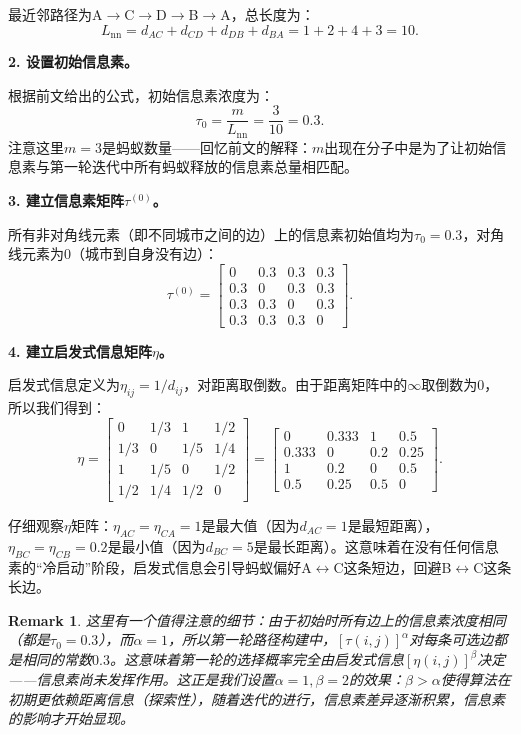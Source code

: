 \documentclass[lang=cn,zihao=-4,a4paper,fontset=windows]{beautybook}
\newtheorem*{remark}{\textbf{Remark}}
\begin{document}
最近邻路径为A$\to$C$\to$D$\to$B$\to$A，总长度为：
\[
L_{\text{nn}} = d_{AC} + d_{CD} + d_{DB} + d_{BA} = 1 + 2 + 4 + 3 = 10.
\]

\textbf{2. 设置初始信息素。}

根据前文给出的公式，初始信息素浓度为：
\[
\tau_0 = \frac{m}{L_{\text{nn}}} = \frac{3}{10} = 0.3.
\]
注意这里$m=3$是蚂蚁数量——回忆前文的解释：$m$出现在分子中是为了让初始信息素与第一轮迭代中所有蚂蚁释放的信息素总量相匹配。

\textbf{3. 建立信息素矩阵$\tau^{(0)}$。}

所有非对角线元素（即不同城市之间的边）上的信息素初始值均为$\tau_0 = 0.3$，对角线元素为0（城市到自身没有边）：
\[
\tau^{(0)} = \begin{bmatrix}
0 & 0.3 & 0.3 & 0.3 \\
0.3 & 0 & 0.3 & 0.3 \\
0.3 & 0.3 & 0 & 0.3 \\
0.3 & 0.3 & 0.3 & 0
\end{bmatrix}.
\]

\textbf{4. 建立启发式信息矩阵$\eta$。}

启发式信息定义为$\eta_{ij} = 1/d_{ij}$，对距离取倒数。由于距离矩阵中的$\infty$取倒数为0，所以我们得到：
\[
\eta = \begin{bmatrix}
0 & 1/3 & 1 & 1/2 \\
1/3 & 0 & 1/5 & 1/4 \\
1 & 1/5 & 0 & 1/2 \\
1/2 & 1/4 & 1/2 & 0
\end{bmatrix}
= \begin{bmatrix}
0 & 0.333 & 1 & 0.5 \\
0.333 & 0 & 0.2 & 0.25 \\
1 & 0.2 & 0 & 0.5 \\
0.5 & 0.25 & 0.5 & 0
\end{bmatrix}.
\]

仔细观察$\eta$矩阵：$\eta_{AC}=\eta_{CA}=1$是最大值（因为$d_{AC}=1$是最短距离），$\eta_{BC}=\eta_{CB}=0.2$是最小值（因为$d_{BC}=5$是最长距离）。这意味着在没有任何信息素的“冷启动”阶段，启发式信息会引导蚂蚁偏好A$\leftrightarrow$C这条短边，回避B$\leftrightarrow$C这条长边。

\begin{remark}
这里有一个值得注意的细节：由于初始时所有边上的信息素浓度相同（都是$\tau_0 = 0.3$），而$\alpha=1$，所以第一轮路径构建中，$[\tau(i,j)]^\alpha$对每条可选边都是相同的常数$0.3$。这意味着第一轮的选择概率完全由启发式信息$[\eta(i,j)]^\beta$决定——信息素尚未发挥作用。这正是我们设置$\alpha=1, \beta=2$的效果：$\beta>\alpha$使得算法在初期更依赖距离信息（探索性），随着迭代的进行，信息素差异逐渐积累，信息素的影响才开始显现。
\end{remark}
\end{document}
